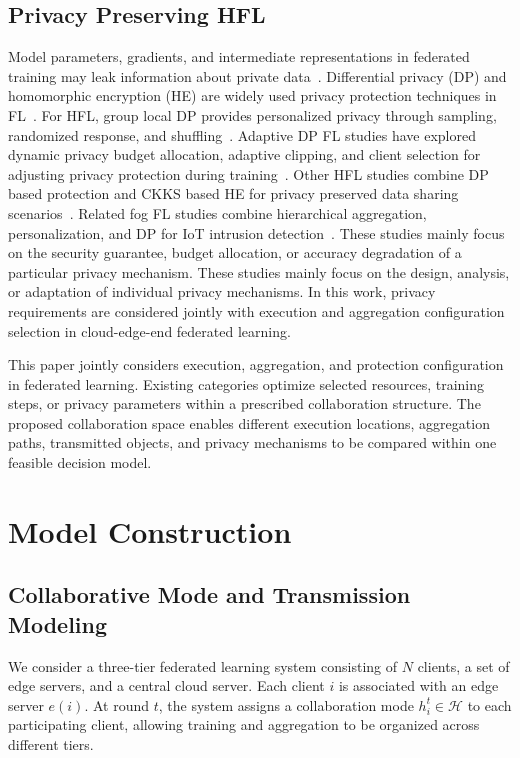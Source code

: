 \documentclass[5p,times]{elsarticle}
\theoremstyle{plain}
\theoremstyle{definition}
\theoremstyle{remark}
\begin{document}
\subsection{Privacy Preserving HFL}
Model parameters, gradients, and intermediate representations in federated
training may leak information about private data~\cite{zhu2019dlg}.
Differential privacy (DP) and homomorphic encryption (HE) are widely used
privacy protection techniques in FL~\cite{dwork2006calibrating,cheon2017ckks}.
For HFL, group local DP provides personalized privacy through sampling,
randomized response, and shuffling~\cite{GLDP}.
Adaptive DP FL studies have explored dynamic privacy budget allocation,
adaptive clipping, and client selection for adjusting privacy protection
during training~\cite{xu2025adpfl}.
Other HFL studies combine DP based protection and CKKS based HE for privacy
preserved data sharing scenarios~\cite{PPHFL}.
Related fog FL studies combine hierarchical aggregation, personalization, and DP
for IoT intrusion detection~\cite{islam2025pphffl}.
These studies mainly focus on the security guarantee, budget allocation, or
accuracy degradation of a particular privacy mechanism.
These studies mainly focus on the design, analysis, or adaptation of individual
privacy mechanisms. In this work, privacy requirements are considered jointly
with execution and aggregation configuration selection in cloud-edge-end
federated learning.

This paper jointly considers execution, aggregation, and protection
configuration in federated learning.
Existing categories optimize selected resources, training steps, or privacy
parameters within a prescribed collaboration structure. The proposed collaboration space enables different execution locations,
aggregation paths, transmitted objects, and privacy mechanisms to be compared
within one feasible decision model.
\section{Model Construction}
\label{sec:model}
\subsection{Collaborative Mode and Transmission Modeling}
\label{sec:link_model}
We consider a three-tier federated learning system
consisting of \(N\) clients, a set of edge servers,
and a central cloud server. Each client \(i\) is
associated with an edge server \(e(i)\). At round
\(t\), the system assigns a collaboration mode
\(h_i^t\in\mathcal H\) to each participating client,
allowing training and aggregation to be organized
across different tiers.
\end{document}
